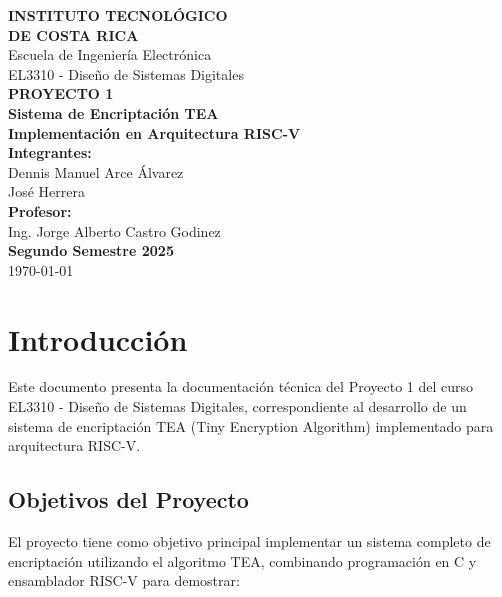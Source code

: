 \documentclass[12pt,a4paper]{article}
\begin{document}
\begin{titlepage}
    \centering
    \vspace*{1.5cm}
    
    {\LARGE \textbf{INSTITUTO TECNOLÓGICO}}\\[0.3cm]
    {\LARGE \textbf{DE COSTA RICA}}\\[1.5cm]
    {\large Escuela de Ingeniería Electrónica}\\[0.8cm]
    {\large EL3310 - Diseño de Sistemas Digitales}\\[2cm]
    
    {\Huge \textbf{PROYECTO 1}}\\[1cm]
    {\LARGE \textbf{Sistema de Encriptación TEA}}\\[0.5cm]
    {\large \textbf{Implementación en Arquitectura RISC-V}}\\[3cm]
    
    {\large \textbf{Integrantes:}}\\[0.5cm]
    {\large Dennis Manuel Arce Álvarez}\\
    {\large José Herrera}\\[2cm]
    
    {\large \textbf{Profesor:}}\\[0.5cm]
    {\large Ing. Jorge Alberto Castro Godinez}\\[2cm]
    
    {\large \textbf{Segundo Semestre 2025}}\\[1cm]
    {\large \today}
    
\end{titlepage}

\tableofcontents
\newpage

\section{Introducción}

Este documento presenta la documentación técnica del Proyecto 1 del curso EL3310 - Diseño de Sistemas Digitales, correspondiente al desarrollo de un sistema de encriptación TEA (Tiny Encryption Algorithm) implementado para arquitectura RISC-V.

\subsection{Objetivos del Proyecto}

El proyecto tiene como objetivo principal implementar un sistema completo de encriptación utilizando el algoritmo TEA, combinando programación en C y ensamblador RISC-V para demostrar:
\end{document}
